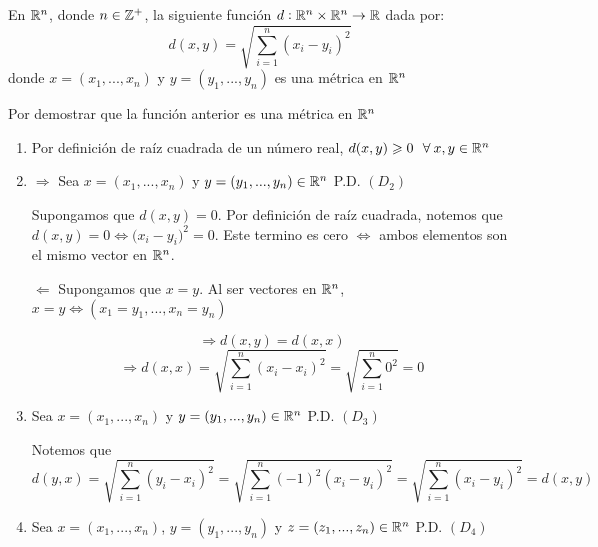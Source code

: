 \begin{eg}
    En ${\mathbb{R}}^{n}$, donde $n \in {\ensuremath{\mathbb{Z}}}^{+}$, la siguiente función $d: {\mathbb{R}}^{n} \times {\ensuremath{\mathbb{R}}}^{n} \to \mathbb{R}$ dada por:
    \begin{equation*}
        d(x,y) = \sqrt{\sum_{i=1}^{n} {({x}_{i}-{y}_{i})}^{2}}
    \end{equation*}
    donde $x=({x}_{1},...,{x}_{n})$ y  $y=({y}_{1},...,{y}_{n})$ es una métrica en ${\mathbb{R}}^{n} $
\end{eg}
\begin{explanation}
Por demostrar que la función anterior es una métrica en $\mathbb{R}^n$
    \begin{enumerate}[label=(\subscript{D}{{\arabic*}})]
        \item Por definición de raíz cuadrada de un número real, $d(x,y) \geqslant 0 \: \: \: \forall \: x,y \in {\ensuremath{\mathbb{R}}}^{n}$
        \item $\Longrightarrow$ Sea $x=({x}_{1},...,{x}_{n})$ y $y = ({y}_{1},...,{y}_{n}) \in {\ensuremath{\mathbb{R}}}^{n}$ P.D. $(D_2)$

        Supongamos que $d(x,y)=0$. Por definición de raíz cuadrada, notemos que $d(x,y)=0 \Leftrightarrow ({{x}_{i}-{y}_{i})}^{2} = 0$. Este termino es cero $\Leftrightarrow$ ambos elementos son el mismo vector en $\mathbb{R}^n$.

        $\Longleftarrow$ Supongamos que $x=y$. Al ser vectores en $\mathbb{R}^n$, $x=y \Leftrightarrow ({x}_{1}={y}_{1},...,{x}_{n}={y}_{n})$

        \begin{equation*}
            \Rightarrow d(x,y) = d(x,x)
        \end{equation*}
        \begin{equation*}
            \Rightarrow d(x,x) = \sqrt{\sum_{i=1}^{n} {({x}_{i}-{x}_{i})}^{2}} = \sqrt{\sum_{i=1}^{n} {0}^{2}} = 0
        \end{equation*}
        
        \item Sea $x=({x}_{1},...,{x}_{n})$ y $y = ({y}_{1},...,{y}_{n}) \in {\ensuremath{\mathbb{R}}}^{n}$ P.D. $(D_3)$

        Notemos que
        \begin{equation*}
        d(y,x) = \sqrt{\sum_{i=1}^{n} {({y}_{i}-{x}_{i})}^{2}} = \sqrt{\sum_{i=1}^{n} {{(-1)}^{2}({x}_{i}-{y}_{i})}^{2}} = \sqrt{\sum_{i=1}^{n} {({x}_{i}-{y}_{i})}^{2}} = d(x,y)
        \end{equation*}
        
        \item Sea $x=({x}_{1},...,{x}_{n})$, $y = ({y}_{1},...,{y}_{n})$ y $z = ({z}_{1},...,{z}_{n}) \in {\ensuremath{\mathbb{R}}}^{n}$ P.D. $(D_4)$        
    \end{enumerate}
\end{explanation}
